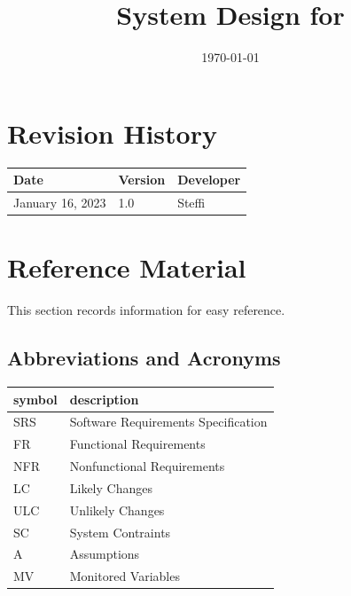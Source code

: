\documentclass[12pt, titlepage]{article}
\begin{document}
\title{System Design for \progname{}} 
\author{\authname}
\date{\today}

\maketitle


\section{Revision History}

\begin{tabularx}{\textwidth}{p{3cm}p{2cm}X}
\toprule {\bf Date} & {\bf Version} & {\bf Developer}\\
\midrule
January 16, 2023 & 1.0 & Steffi\\
\bottomrule
\end{tabularx}

\newpage

\section{Reference Material}

This section records information for easy reference.

\subsection{Abbreviations and Acronyms}

\renewcommand{\arraystretch}{1.2}
\begin{tabular}{l l} 
  \toprule		
  \textbf{symbol} & \textbf{description}\\
  \midrule 
  SRS & Software Requirements Specification\\
  FR & Functional Requirements\\
  NFR & Nonfunctional Requirements\\
  LC & Likely Changes\\
  ULC & Unlikely Changes\\
  SC & System Contraints\\
  A & Assumptions\\
  MV & Monitored Variables\\
  \bottomrule
\end{tabular}\\

\newpage

\tableofcontents
\end{document}
